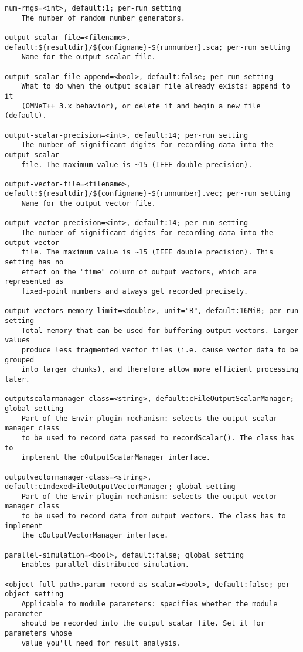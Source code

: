 \begin{verbatim}
num-rngs=<int>, default:1; per-run setting
    The number of random number generators.

output-scalar-file=<filename>, default:${resultdir}/${configname}-${runnumber}.sca; per-run setting
    Name for the output scalar file.

output-scalar-file-append=<bool>, default:false; per-run setting
    What to do when the output scalar file already exists: append to it
    (OMNeT++ 3.x behavior), or delete it and begin a new file (default).

output-scalar-precision=<int>, default:14; per-run setting
    The number of significant digits for recording data into the output scalar
    file. The maximum value is ~15 (IEEE double precision).

output-vector-file=<filename>, default:${resultdir}/${configname}-${runnumber}.vec; per-run setting
    Name for the output vector file.

output-vector-precision=<int>, default:14; per-run setting
    The number of significant digits for recording data into the output vector
    file. The maximum value is ~15 (IEEE double precision). This setting has no
    effect on the "time" column of output vectors, which are represented as
    fixed-point numbers and always get recorded precisely.

output-vectors-memory-limit=<double>, unit="B", default:16MiB; per-run setting
    Total memory that can be used for buffering output vectors. Larger values
    produce less fragmented vector files (i.e. cause vector data to be grouped
    into larger chunks), and therefore allow more efficient processing later.

outputscalarmanager-class=<string>, default:cFileOutputScalarManager; global setting
    Part of the Envir plugin mechanism: selects the output scalar manager class
    to be used to record data passed to recordScalar(). The class has to
    implement the cOutputScalarManager interface.

outputvectormanager-class=<string>, default:cIndexedFileOutputVectorManager; global setting
    Part of the Envir plugin mechanism: selects the output vector manager class
    to be used to record data from output vectors. The class has to implement
    the cOutputVectorManager interface.

parallel-simulation=<bool>, default:false; global setting
    Enables parallel distributed simulation.

<object-full-path>.param-record-as-scalar=<bool>, default:false; per-object setting
    Applicable to module parameters: specifies whether the module parameter
    should be recorded into the output scalar file. Set it for parameters whose
    value you'll need for result analysis.


\end{verbatim}
